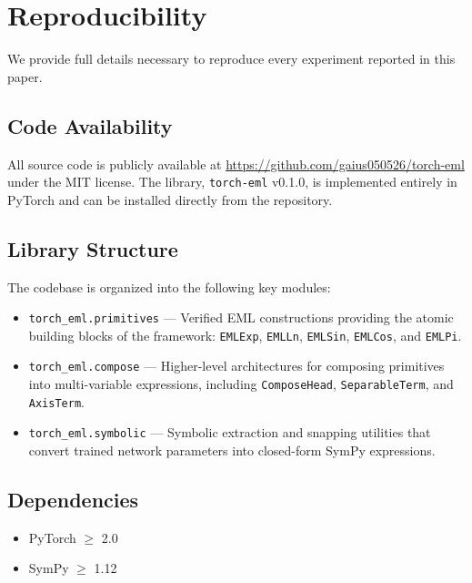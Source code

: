 \section{Reproducibility}
\label{app:reproducibility}

We provide full details necessary to reproduce every experiment
reported in this paper.

\subsection{Code Availability}

All source code is publicly available at
\url{https://github.com/gaius050526/torch-eml} under the MIT license.
The library, \texttt{torch-eml} v0.1.0, is implemented entirely in
PyTorch and can be installed directly from the repository.

\subsection{Library Structure}

The codebase is organized into the following key modules:

\begin{itemize}
  \item \texttt{torch\_eml.primitives} --- Verified EML constructions
    providing the atomic building blocks of the framework:
    \texttt{EMLExp}, \texttt{EMLLn}, \texttt{EMLSin},
    \texttt{EMLCos}, and \texttt{EMLPi}.
  \item \texttt{torch\_eml.compose} --- Higher-level architectures for
    composing primitives into multi-variable expressions, including
    \texttt{ComposeHead}, \texttt{SeparableTerm}, and
    \texttt{AxisTerm}.
  \item \texttt{torch\_eml.symbolic} --- Symbolic extraction and
    snapping utilities that convert trained network parameters into
    closed-form SymPy expressions.
\end{itemize}

\subsection{Dependencies}

\begin{itemize}
  \item PyTorch $\geq$ 2.0
  \item SymPy $\geq$ 1.12
\end{itemize}

